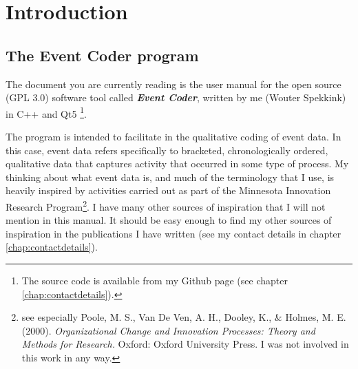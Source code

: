 \documentclass{memoir}
\begin{document}

\tableofcontents
\chapter{Introduction}
\label{chap:introduction}

\section{The Event Coder program}
\label{sec:eventcoderprogram}

The document you are currently reading is the user manual for the open source (GPL 3.0) software tool called \emph{\textbf{Event Coder}}, written by me (Wouter Spekkink) in C++ and Qt5 \footnote{The source code is available from my Github page (see chapter \ref{chap:contactdetails}).}.

The program is intended to facilitate in the qualitative coding of event data. In this case, event data refers specifically to bracketed, chronologically ordered, qualitative data that captures activity that occurred in some type of process. My thinking about what event data is, and much of the terminology that I use, is heavily inspired by activities carried out as part of the Minnesota Innovation Research Program\footnote{see especially Poole, M. S., Van De Ven, A. H., Dooley, K., \& Holmes, M. E. (2000). \emph{Organizational Change and Innovation Processes: Theory and Methods for Research.} Oxford: Oxford University Press. I was not involved in this work in any way.}. I have many other sources of inspiration that I will not mention in this manual. It should be easy enough to find my other sources of inspiration in the publications I have written (see my contact details in chapter \ref{chap:contactdetails}).
\end{document}
